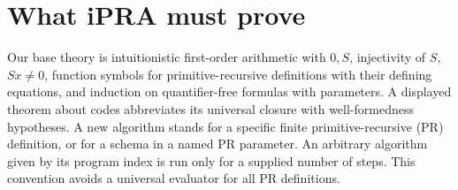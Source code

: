 \section{What iPRA must prove}\label{sec:arith}
Our base theory is intuitionistic first-order arithmetic with $0,S$, injectivity of $S$, $Sx\ne0$, function symbols for primitive-recursive definitions with their defining equations, and induction on quantifier-free formulas with parameters. A displayed theorem about codes abbreviates its universal closure with well-formedness hypotheses. A new algorithm stands for a specific finite primitive-recursive (PR) definition, or for a schema in a named PR parameter. An arbitrary algorithm given by its program index is run only for a supplied number of steps. This convention avoids a universal evaluator for all PR definitions.

